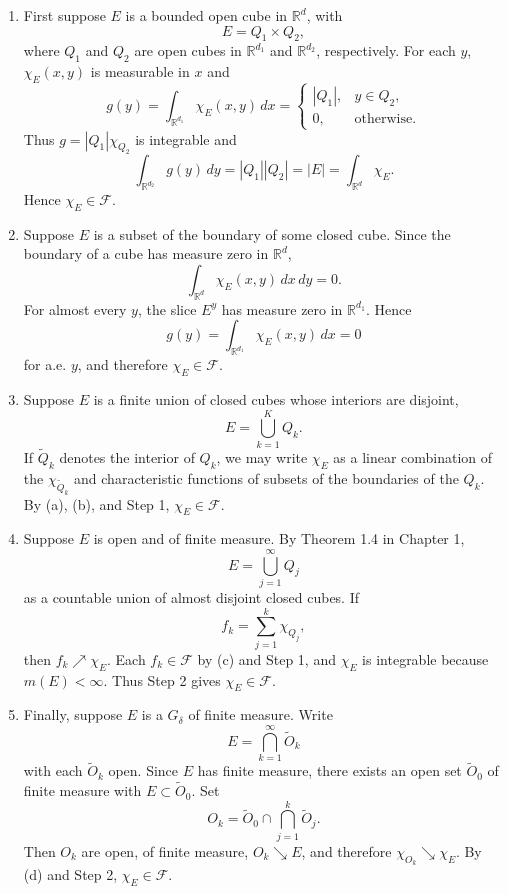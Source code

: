 \documentclass[11pt,openany]{book}
\begin{document}
\begin{enumerate}
\item[(a)] First suppose $E$ is a bounded open cube in $\mathbb{R}^d$, with
\[
E=Q_1\times Q_2,
\]
where $Q_1$ and $Q_2$ are open cubes in $\mathbb{R}^{d_1}$ and $\mathbb{R}^{d_2}$, respectively. For each $y$, $\chi_E(x,y)$ is measurable in $x$ and
\[
g(y)=\int_{\mathbb{R}^{d_1}}\chi_E(x,y)\,dx
=
\begin{cases}
|Q_1|,&y\in Q_2,\\
0,&\text{otherwise}.
\end{cases}
\]
Thus $g=|Q_1|\chi_{Q_2}$ is integrable and
\[
\int_{\mathbb{R}^{d_2}}g(y)\,dy=|Q_1||Q_2|=|E|
=\int_{\mathbb{R}^d}\chi_E.
\]
Hence $\chi_E\in\mathcal{F}$.

\item[(b)] Suppose $E$ is a subset of the boundary of some closed cube. Since the boundary of a cube has measure zero in $\mathbb{R}^d$,
\[
\int_{\mathbb{R}^d}\chi_E(x,y)\,dx\,dy=0.
\]
For almost every $y$, the slice $E^y$ has measure zero in $\mathbb{R}^{d_1}$. Hence
\[
g(y)=\int_{\mathbb{R}^{d_1}}\chi_E(x,y)\,dx=0
\]
for a.e. $y$, and therefore $\chi_E\in\mathcal{F}$.

\item[(c)] Suppose $E$ is a finite union of closed cubes whose interiors are disjoint,
\[
E=\bigcup_{k=1}^{K}Q_k.
\]
If $\widetilde Q_k$ denotes the interior of $Q_k$, we may write $\chi_E$ as a linear combination of the $\chi_{\widetilde Q_k}$ and characteristic functions of subsets of the boundaries of the $Q_k$. By (a), (b), and Step 1, $\chi_E\in\mathcal{F}$.

\item[(d)] Suppose $E$ is open and of finite measure. By Theorem 1.4 in Chapter 1,
\[
E=\bigcup_{j=1}^{\infty}Q_j
\]
as a countable union of almost disjoint closed cubes. If
\[
f_k=\sum_{j=1}^{k}\chi_{Q_j},
\]
then $f_k\nearrow\chi_E$. Each $f_k\in\mathcal{F}$ by (c) and Step 1, and $\chi_E$ is integrable because $m(E)<\infty$. Thus Step 2 gives $\chi_E\in\mathcal{F}$.

\item[(e)] Finally, suppose $E$ is a $G_\delta$ of finite measure. Write
\[
E=\bigcap_{k=1}^{\infty}\widetilde O_k
\]
with each $\widetilde O_k$ open. Since $E$ has finite measure, there exists an open set $\widetilde O_0$ of finite measure with $E\subset\widetilde O_0$. Set
\[
O_k=\widetilde O_0\cap\bigcap_{j=1}^{k}\widetilde O_j.
\]
Then $O_k$ are open, of finite measure, $O_k\searrow E$, and therefore $\chi_{O_k}\searrow\chi_E$. By (d) and Step 2, $\chi_E\in\mathcal{F}$.
\end{enumerate}
\end{document}
